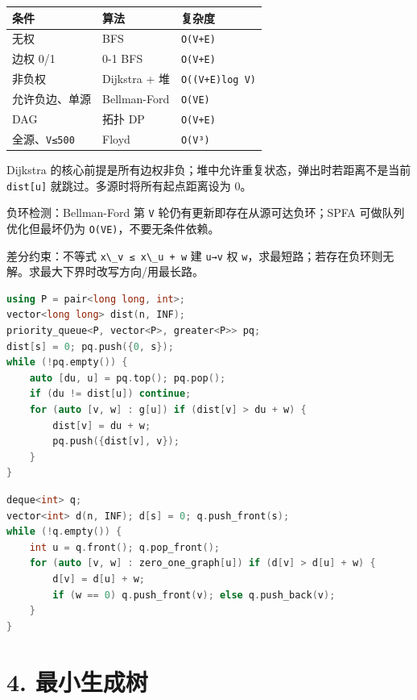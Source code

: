 \begin{longtable}[]{@{}lll@{}}
\toprule\noalign{}
条件 & 算法 & 复杂度 \\
\midrule\noalign{}
\endhead
\bottomrule\noalign{}
\endlastfoot
无权 & BFS & \passthrough{\lstinline!O(V+E)!} \\
边权 0/1 & 0-1 BFS & \passthrough{\lstinline!O(V+E)!} \\
非负权 & Dijkstra + 堆 & \passthrough{\lstinline!O((V+E)log V)!} \\
允许负边、单源 & Bellman-Ford & \passthrough{\lstinline!O(VE)!} \\
DAG & 拓扑 DP & \passthrough{\lstinline!O(V+E)!} \\
全源、\passthrough{\lstinline!V≤500!} & Floyd & \passthrough{\lstinline!O(V³)!} \\
\end{longtable}

Dijkstra 的核心前提是所有边权非负；堆中允许重复状态，弹出时若距离不是当前 \passthrough{\lstinline!dist[u]!} 就跳过。多源时将所有起点距离设为 0。

负环检测：Bellman-Ford 第 \passthrough{\lstinline!V!} 轮仍有更新即存在从源可达负环；SPFA 可做队列优化但最坏仍为 \passthrough{\lstinline!O(VE)!}，不要无条件依赖。

差分约束：不等式 \passthrough{\lstinline!x\_v ≤ x\_u + w!} 建 \passthrough{\lstinline!u→v!} 权 \passthrough{\lstinline!w!}，求最短路；若存在负环则无解。求最大下界时改写方向/用最长路。

\begin{lstlisting}[language={C++}]
using P = pair<long long, int>;
vector<long long> dist(n, INF);
priority_queue<P, vector<P>, greater<P>> pq;
dist[s] = 0; pq.push({0, s});
while (!pq.empty()) {
    auto [du, u] = pq.top(); pq.pop();
    if (du != dist[u]) continue;
    for (auto [v, w] : g[u]) if (dist[v] > du + w) {
        dist[v] = du + w;
        pq.push({dist[v], v});
    }
}
\end{lstlisting}

\begin{lstlisting}[language={C++}]
deque<int> q;
vector<int> d(n, INF); d[s] = 0; q.push_front(s);
while (!q.empty()) {
    int u = q.front(); q.pop_front();
    for (auto [v, w] : zero_one_graph[u]) if (d[v] > d[u] + w) {
        d[v] = d[u] + w;
        if (w == 0) q.push_front(v); else q.push_back(v);
    }
}
\end{lstlisting}

\section{4. 最小生成树}\label{ux6700ux5c0fux751fux6210ux6811}

